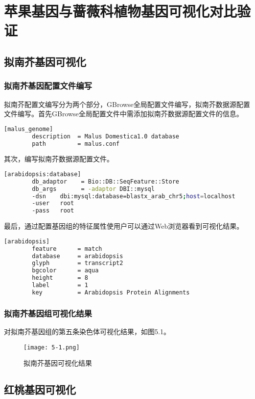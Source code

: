 \chapter{苹果基因与蔷薇科植物基因可视化对比验证}
	\section{拟南芥基因可视化}
		\subsection{拟南芥基因配置文件编写}
		拟南芥配置文编写分为两个部分，GBrowse全局配置文件编写，拟南芥数据源配置文件编写。首先GBrowse全局配置文件中需添加拟南芥数据源配置文件的信息。
		\begin{lstlisting}[language=bash]
		[malus_genome]
		description  = Malus Domestica1.0 database
		path         = malus.conf
		\end{lstlisting}
		其次，编写拟南芥数据源配置文件。
		\begin{lstlisting}[language=bash]
		[arabidopsis:database]
		db_adaptor    = Bio::DB::SeqFeature::Store
		db_args       = -adaptor DBI::mysql
		-dsn    dbi:mysql:database=blastx_arab_chr5;host=localhost
		-user   root
		-pass   root
		\end{lstlisting}
		最后，通过配置基因组的特征属性使用户可以通过Web浏览器看到可视化结果。
		\begin{lstlisting}[language=bash]
		[arabidopsis]
		feature      = match
		database     = arabidopsis
		glyph        = transcript2 
		bgcolor      = aqua
		height       = 8
		label        = 1
		key          = Arabidopsis Protein Alignments
		\end{lstlisting}
		\subsection{拟南芥基因组可视化结果}
		对拟南芥基因组的第五条染色体可视化结果，如图5.1。
		\begin{figure}[!ht]
			\centering
			\texttt{[image: 5-1.png]}
			\caption{拟南芥基因可视化结果}
		\end{figure}
	\section{红桃基因可视化}
